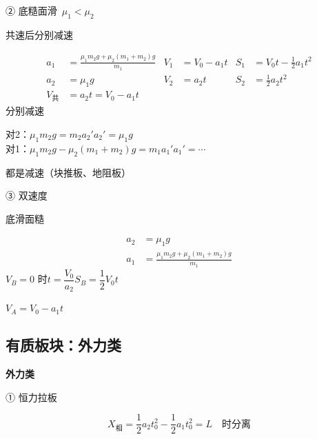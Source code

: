 \noindent ② 底糙面滑\ $\mu_1<\mu_2$

\noindent 共速后分别减速

\begin{align*}
a_1&=\frac{\mu_1m_2g+\mu_2(m_1+m_2)g}{m_1} & V_1&=V_0-a_1t & S_1&=V_0t-\frac12a_1t^2\\
a_2&=\mu_1g & V_2&=a_2t & S_2&=\frac12a_2t^2\\
V_{\text{共}}&=a_2t=V_0-a_1t
\end{align*}
\noindent 分别减速

\noindent 对2：$\mu_1m_2g=m_2a_2'$\quad $a_2'=\mu_1g$\\
对1：$\mu_1m_2g-\mu_2(m_1+m_2)g=m_1a_1'$\quad $a_1'=\cdots$%

\noindent 都是减速（块推板、地阻板）%

\noindent ③ 双速度

\noindent 底滑面糙

\begin{align*}
a_2&=\mu_1g\\
a_1&=\frac{\mu_1m_2g+\mu_2(m_1+m_2)g}{m_1}
\end{align*}
\noindent $V_B=0$ 时\quad $t=\dfrac{V_0}{a_2}$\quad $S_B=\dfrac12V_0t$

\noindent $V_A=V_0-a_1t$


\subsection{有质板块：外力类}
\textbf{外力类}

\noindent ① 恒力拉板

\[
X_{\text{相}}=\frac12a_2t_0^2-\frac12a_1t_0^2=L\quad\text{时分离}
\]

